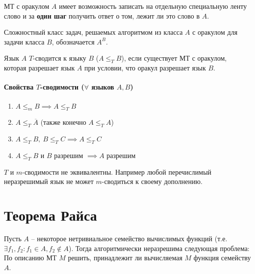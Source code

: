 \documentclass[11pt]{article}
\begin{document}
\begin{definition}
  МТ с оракулом $A$ имеет возможность записать на отдельную специальную 
  ленту слово и за \textbf{один шаг} получить ответ о том, лежит ли это 
  слово в $A$.
\end{definition}

\begin{definition}
  Сложностный класс задач, решаемых алгоритмом из класса $A$ с оракулом 
  для задачи класса $B$, обозначается $A^B$.
\end{definition}

\begin{definition}
  Язык $A$ $T$-сводится к языку $B$ ($A \leq_T B$), если существует МТ с 
  оракулом, которая разрешает язык $A$ при условии, что оракул разрешает 
  язык $B$.
\end{definition}

\paragraph{Свойства $T$-сводимости ($\forall$ языков $A, B$)}

\begin{enumerate}
  \item $A \leq_m B \implies A \leq_T B$
  \item $A \leq_T \overline{A}$ (также конечно $A \leq_T A$)
  \item $A \leq_T B, \ B \leq_T C \implies A \leq_T C$
  \item $A \leq_T B$ и $B$ разрешим $\implies A$ разрешим
\end{enumerate}

\begin{remark}
  $T$ и $m$-сводимости не эквивалентны. Например любой перечислимый 
  неразрешимый язык не может $m$-сводиться к своему дополнению.
\end{remark}

\section{Теорема Райса}

\begin{theorem}
  Пусть $A$ -- некоторое нетривиальное семейство вычислимых функций (т.е. 
  $\exists f_1, f_2: f_1 \in A, f_2 \notin A$). Тогда алгоритмически 
  неразрешима следующая проблема: \\
  По описанию МТ $M$ решить, принадлежит ли вычисляемая $M$ функция 
  семейству $A$.
\end{theorem}
\end{document}
